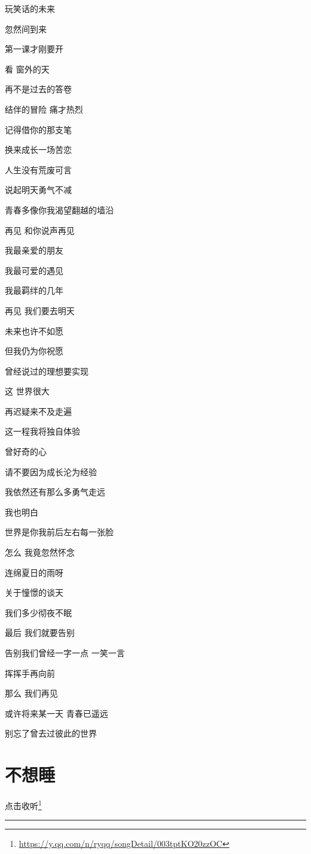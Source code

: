 \documentclass[]{ctexbook}
\renewcommand{\href}[2]{#2\footnote{\url{#1}}}
\begin{document}
玩笑话的未来

忽然间到来

第一课才刚要开

看 窗外的天

再不是过去的答卷

结伴的冒险 痛才热烈

记得借你的那支笔

换来成长一场苦恋

人生没有荒废可言

说起明天勇气不减

青春多像你我渴望翻越的墙沿

再见 和你说声再见

我最亲爱的朋友

我最可爱的遇见

我最羁绊的几年

再见 我们要去明天

未来也许不如愿

但我仍为你祝愿

曾经说过的理想要实现

这 世界很大

再迟疑来不及走遍

这一程我将独自体验

曾好奇的心

请不要因为成长沦为经验

我依然还有那么多勇气走远

我也明白

世界是你我前后左右每一张脸

怎么 我竟忽然怀念

连绵夏日的雨呀

关于憧憬的谈天

我们多少彻夜不眠

最后 我们就要告别

告别我们曾经一字一点 一笑一言

挥挥手再向前

那么 我们再见

或许将来某一天 青春已遥远

别忘了曾去过彼此的世界

\section*{不想睡}\label{keep-playing}


\href{https://y.qq.com/n/ryqq/songDetail/003tptKO20zzOC}{点击收听}

\begin{center}\rule{0.5\linewidth}{0.5pt}\end{center}
\end{document}

